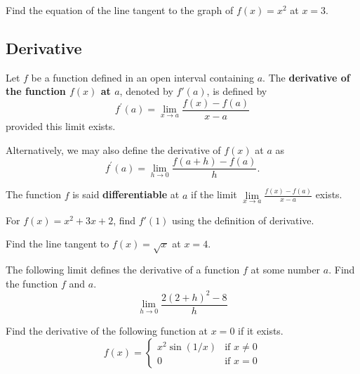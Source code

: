 \begin{example}
  Find the equation of the line tangent to the graph of  $f(x)=x^2$  at $x=3$.
\end{example}
\vspace*{6\baselineskip}

\hypertarget{derivative}{%
\subsection{Derivative}\label{derivative}}

\begin{definition}
  Let \(f\) be a function defined in an open interval
  containing \(a\). The \textbf{derivative of the function \(f(x)\) at
  \(a\)}, denoted by \(f'(a)\), is defined by \[
  f^{\prime}(a)=\lim\limits_{x \to a} \frac{f(x)-f(a)}{x-a}
  \] provided this limit exists.
  
  Alternatively, we may also define the derivative of \(f(x)\) at \(a\) as
  \[
  f^{\prime}(a)=\lim\limits_{h \to 0} \frac{f(a+h)-f(a)}{h}.
  \]
  
  The function \(f\) is said \textbf{differentiable} at \(a\) if the limit
  \(\lim\limits_{x \to a} \frac{f(x)-f(a)}{x-a}\) exists.  
\end{definition}

\begin{example}
For \(f(x)=x^2+3x+2\), find \(f'(1)\) using the definition of
derivative.
\end{example}
\vspace*{6\baselineskip}

\begin{example}
Find the line tangent to \(f(x)=\sqrt{x}\) at \(x=4\).
\end{example}
\vspace*{6\baselineskip}

\begin{example}
The following limit defines the derivative of a
function \(f\) at some number \(a\). Find the function \(f\) and
\(a\).\\
\[\lim\limits_{h\to 0}\dfrac{2(2+h)^2-8}{h}\]
\end{example}
\vspace*{6\baselineskip}

\begin{example}
Find the derivative of the following function at \(x=0\) if it exists.
\[
f(x)=\begin{cases}x^{2}\sin(1/x)&{\text{if }}x\neq 0\\0&{\text{if }}x=0\end{cases}
\]
\end{example}
\vspace*{6\baselineskip}

